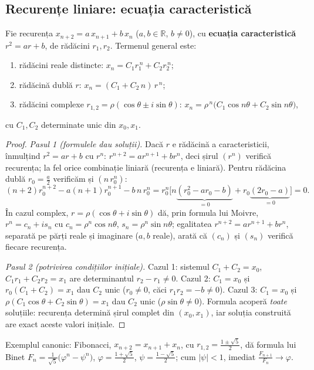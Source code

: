 \subsection{Recurențe liniare: ecuația caracteristică}

\begin{teorema}
Fie recurența $x_{n+2}=a\,x_{n+1}+b\,x_n$ ($a,b\in\mathbb{R}$, $b\neq0$), cu \textbf{ecuația caracteristică} $r^2=ar+b$, de rădăcini $r_1,r_2$. Termenul general este:
\begin{enumerate}[leftmargin=*, itemsep=1pt]
\item rădăcini reale distincte: \quad $x_n=C_1r_1^{\,n}+C_2r_2^{\,n}$;
\item rădăcină dublă $r$: \quad $x_n=(C_1+C_2\,n)\,r^{\,n}$;
\item rădăcini complexe $r_{1,2}=\rho(\cos\theta\pm i\sin\theta)$: \quad $x_n=\rho^{\,n}\big(C_1\cos n\theta+C_2\sin n\theta\big)$,
\end{enumerate}
cu $C_1,C_2$ determinate unic din $x_0,x_1$.
\end{teorema}
\begin{proof}
\emph{Pasul 1 (formulele dau soluții).} Dacă $r$ e rădăcină a caracteristicii, înmulțind $r^2=ar+b$ cu $r^n$: $r^{n+2}=ar^{n+1}+br^n$, deci șirul $(r^n)$ verifică recurența; la fel orice combinație liniară (recurența e liniară). Pentru rădăcina dublă $r_0=\frac a2$ verificăm și $(n\,r_0^n)$:
\[
(n+2)r_0^{n+2}-a(n+1)r_0^{n+1}-b\,n\,r_0^{n}
=r_0^{n}\Big[n\underbrace{(r_0^2-ar_0-b)}_{=0}+r_0\underbrace{(2r_0-a)}_{=0}\Big]=0.
\]
În cazul complex, $r=\rho(\cos\theta+i\sin\theta)$ dă, prin formula lui Moivre, $r^n=c_n+is_n$ cu $c_n=\rho^n\cos n\theta$, $s_n=\rho^n\sin n\theta$; egalitatea $r^{n+2}=ar^{n+1}+br^n$, separată pe părți reale și imaginare ($a,b$ reale), arată că $(c_n)$ și $(s_n)$ verifică fiecare recurența.

\emph{Pasul 2 (potrivirea condițiilor inițiale).} Cazul 1: sistemul $C_1+C_2=x_0$, $C_1r_1+C_2r_2=x_1$ are determinantul $r_2-r_1\neq0$. Cazul 2: $C_1=x_0$ și $r_0(C_1+C_2)=x_1$ dau $C_2$ unic ($r_0\neq0$, căci $r_1r_2=-b\neq0$). Cazul 3: $C_1=x_0$ și $\rho(C_1\cos\theta+C_2\sin\theta)=x_1$ dau $C_2$ unic ($\rho\sin\theta\neq0$). Formula acoperă \emph{toate} soluțiile: recurența determină șirul complet din $(x_0,x_1)$, iar soluția construită are exact aceste valori inițiale.
\end{proof}

\begin{obs}
Exemplul canonic: Fibonacci, $x_{n+2}=x_{n+1}+x_n$, cu $r_{1,2}=\frac{1\pm\sqrt5}{2}$, dă formula lui Binet
$F_n=\frac{1}{\sqrt5}\big(\varphi^n-\psi^n\big)$, $\varphi=\frac{1+\sqrt5}2$, $\psi=\frac{1-\sqrt5}2$; cum $|\psi|<1$, imediat $\frac{F_{n+1}}{F_n}\to\varphi$.
\end{obs}


